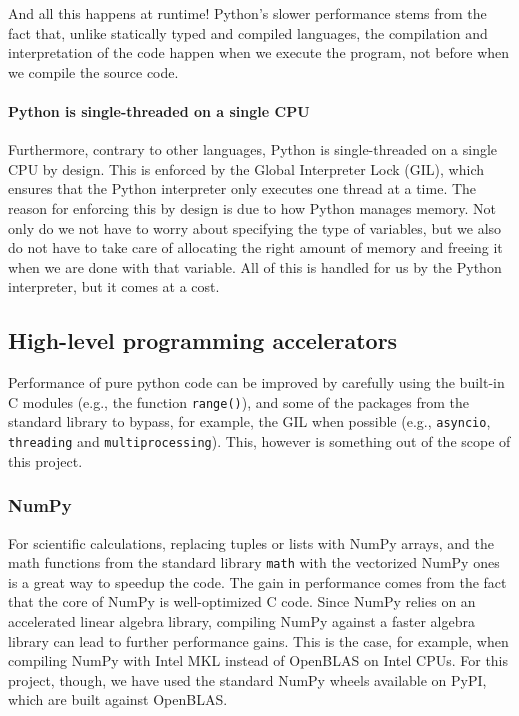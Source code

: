 \documentclass[12pt]{article}
\begin{document}
And all this happens at runtime! Python's slower performance stems from the fact that, unlike statically typed and compiled languages, the compilation and interpretation of the code happen when we execute the program, not before when we compile the source code.

\paragraph{Python is single-threaded on a single CPU} Furthermore, contrary to other languages, Python is single-threaded on a single CPU by design. This is enforced by the Global Interpreter Lock (GIL), which ensures that the Python interpreter only executes one thread at a time. The reason for enforcing this by design is due to how Python manages memory. Not only do we not have to worry about specifying the type of variables, but we also do not have to take care of allocating the right amount of memory and freeing it when we are done with that variable. All of this is handled for us by the Python interpreter, but it comes at a cost.

\subsection{High-level programming accelerators}

Performance of pure python code can be improved by carefully using the built-in C modules (e.g., the function \texttt{range()}), and some of the packages from the standard library to bypass, for example, the GIL when possible (e.g., \texttt{asyncio}, \texttt{threading} and \texttt{multiprocessing}). This, however is something out of the scope of this project.

\subsubsection{NumPy}

For scientific calculations, replacing tuples or lists with NumPy arrays, and the math functions from the standard library \texttt{math} with the vectorized NumPy ones is a great way to speedup the code. The gain in performance comes from the fact that the core of NumPy is well-optimized C code. Since NumPy relies on an accelerated linear algebra library, compiling NumPy against a faster algebra library can lead to further performance gains. This is the case, for example, when compiling NumPy with Intel MKL instead of OpenBLAS on Intel CPUs. For this project, though, we have used the standard NumPy wheels available on PyPI, which are built against OpenBLAS.
\end{document}
